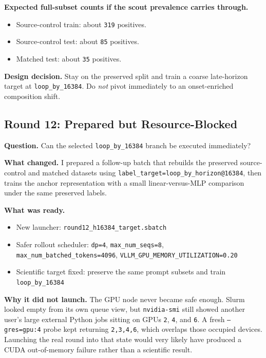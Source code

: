 \documentclass[11pt]{article}
\begin{document}
\textbf{Expected full-subset counts if the scout prevalence carries through.}
\begin{itemize}
  \item Source-control train: about \texttt{319} positives.
  \item Source-control test: about \texttt{85} positives.
  \item Matched test: about \texttt{35} positives.
\end{itemize}

\textbf{Design decision.} Stay on the preserved split and train a coarse late-horizon target at \texttt{loop\_by\_16384}. Do \emph{not} pivot immediately to an onset-enriched composition shift.

\subsection*{Round 12: Prepared but Resource-Blocked}
\textbf{Question.} Can the selected \texttt{loop\_by\_16384} branch be executed immediately?

\textbf{What changed.} I prepared a follow-up batch that rebuilds the preserved source-control and matched datasets using \texttt{label\_target=loop\_by\_horizon@16384}, then trains the anchor representation with a small linear-versus-MLP comparison under the same preserved labels.

\textbf{What was ready.}
\begin{itemize}
  \item New launcher:
    \texttt{round12\_h16384\_target.sbatch}
  \item Safer rollout scheduler:
    \texttt{dp=4},
    \texttt{max\_num\_seqs=8},
    \texttt{max\_num\_batched\_tokens=4096},
    \texttt{VLLM\_GPU\_MEMORY\_UTILIZATION=0.20}
  \item Scientific target fixed:
    preserve the same prompt subsets and train \texttt{loop\_by\_16384}
\end{itemize}

\textbf{Why it did not launch.} The GPU node never became safe enough. Slurm looked empty from its own queue view, but \texttt{nvidia-smi} still showed another user's large external Python jobs sitting on GPUs \texttt{2}, \texttt{4}, and \texttt{6}. A fresh \texttt{--gres=gpu:4} probe kept returning \texttt{2,3,4,6}, which overlaps those occupied devices. Launching the real round into that state would very likely have produced a CUDA out-of-memory failure rather than a scientific result.
\end{document}
